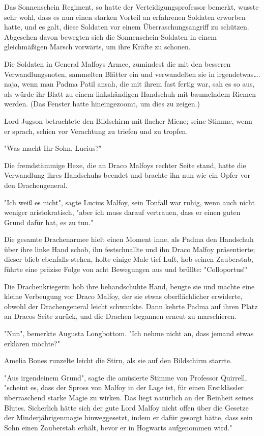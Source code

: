 {Das Sonnenschein Regiment, so hatte der Verteidigungsprofessor bemerkt, wusste sehr wohl, dass es nun einen starken Vorteil an erfahrenen Soldaten erworben hatte, und es galt, diese Soldaten vor einem Überraschungsangriff zu schützen. Abgesehen davon bewegten sich die Sonnenschein-Soldaten in einem gleichmäßigen Marsch vorwärts, um ihre Kräfte zu schonen.

Die Soldaten in General Malfoys Armee, zumindest die mit den besseren Verwandlungsnoten, sammelten Blätter ein und verwandelten sie in irgendetwas…. naja, wenn man Padma Patil ansah, die mit ihrem fast fertig war, sah es so aus, als würde ihr Blatt zu einem linkshändigen Handschuh mit baumelndem Riemen werden. (Das Fenster hatte hineingezoomt, um dies zu zeigen.)

Lord Jugson betrachtete den Bildschirm mit flacher Miene; seine Stimme, wenn er sprach, schien vor Verachtung zu triefen und zu tropfen.

"Was macht Ihr Sohn, Lucius?"

Die fremdstämmige Hexe, die an Draco Malfoys rechter Seite stand, hatte die Verwandlung ihres Handschuhs beendet und brachte ihn nun wie ein Opfer vor den Drachengeneral.

"Ich weiß es nicht", sagte Lucius Malfoy, sein Tonfall war ruhig, wenn auch nicht weniger aristokratisch, "aber ich muss darauf vertrauen, dass er einen guten Grund dafür hat, es zu tun."

Die gesamte Drachenarmee hielt einen Moment inne, als Padma den Handschuh über ihre linke Hand schob, ihn festschnallte und ihn Draco Malfoy präsentierte; dieser blieb ebenfalls stehen, holte einige Male tief Luft, hob seinen Zauberstab, führte eine präzise Folge von acht Bewegungen aus und brüllte: "Colloportus!"

Die Drachenkriegerin hob ihre behandschuhte Hand, beugte sie und machte eine kleine Verbeugung vor Draco Malfoy, der sie etwas oberflächlicher erwiderte, obwohl der Drachengeneral leicht schwankte. Dann kehrte Padma auf ihren Platz an Dracos Seite zurück, und die Drachen begannen erneut zu marschieren.

"Nun", bemerkte Augusta Longbottom. "Ich nehme nicht an, dass jemand etwas erklären möchte?"

Amelia Bones runzelte leicht die Stirn, als sie auf den Bildschirm starrte.

"Aus irgendeinem Grund", sagte die amüsierte Stimme von Professor Quirrell, "scheint es, dass der Spross von Malfoy in der Lage ist, für einen Erstklässler überraschend starke Magie zu wirken. Das liegt natürlich an der Reinheit seines Blutes. Sicherlich hätte sich der gute Lord Malfoy nicht offen über die Gesetze der Minderjährigenmagie hinweggesetzt, indem er dafür gesorgt hätte, dass sein Sohn einen Zauberstab erhält, bevor er in Hogwarts aufgenommen wird."

}
